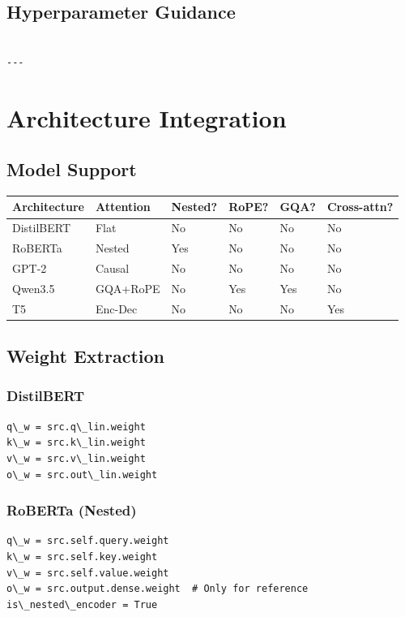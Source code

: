\subsection{Hyperparameter Guidance}

\begin{lstlisting}

---
\end{lstlisting}

\section{Architecture Integration}

\subsection{Model Support}

\begin{table}[H]
\centering
\small
\begin{tabular}{llllll}
\toprule
\textbf{Architecture} & \textbf{Attention} & \textbf{Nested?} & \textbf{RoPE?} & \textbf{GQA?} & \textbf{Cross-attn?} \\
\midrule
DistilBERT & Flat & No & No & No & No \\
RoBERTa & Nested & Yes & No & No & No \\
GPT-2 & Causal & No & No & No & No \\
Qwen3.5 & GQA+RoPE & No & Yes & Yes & No \\
T5 & Enc-Dec & No & No & No & Yes \\
\bottomrule
\end{tabular}
\end{table}

\subsection{Weight Extraction}

\subsubsection{DistilBERT}
\begin{lstlisting}
q\_w = src.q\_lin.weight
k\_w = src.k\_lin.weight
v\_w = src.v\_lin.weight
o\_w = src.out\_lin.weight
\end{lstlisting}

\subsubsection{RoBERTa (Nested)}
\begin{lstlisting}
q\_w = src.self.query.weight
k\_w = src.self.key.weight
v\_w = src.self.value.weight
o\_w = src.output.dense.weight  # Only for reference
is\_nested\_encoder = True
\end{lstlisting}

